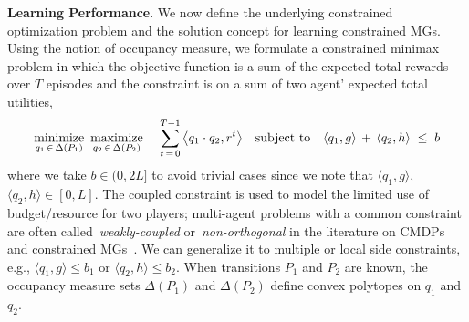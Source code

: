 \documentclass[12pt, final]{l4dc2023}
\begin{document}
\noindent\textbf{Learning Performance}. We now define the underlying constrained optimization problem and the solution concept for learning constrained MGs. Using the notion of occupancy measure, we formulate a constrained minimax problem in which the objective function is a sum of the expected total rewards over $T$ episodes and the constraint is on a sum of two agent' expected total utilities, 
\begin{equation}\label{eq.opt_wc}
\begin{array}{rcl}
\operatorname*{minimize}\limits_{q_1\,\in\,\Delta(P_1)} \,\,\operatorname*{maximize}\limits_{q_2\,\in\,\Delta(P_2)} &&\!\!\!\! \displaystyle \sum_{t\,=\,0}^{T-1} \left\langle q_1\cdot q_2,r^t \right\rangle 
\;\;\; \operatorname*{subject~to} \;\;\;
\left\langle q_1,g \right\rangle \,+\,\left\langle q_2,h \right\rangle\;\leq\; b
\end{array}
\end{equation}
where we take $b \in (0, {2L}]$ to avoid trivial cases since we note that $\langle{q_1},{g}\rangle$, $\langle{q_2},{h}\rangle\in [0,L]$. The coupled constraint is used to model the limited use of budget/resource for two players; multi-agent problems with a common constraint are often called~\emph{weakly-coupled} or~\emph{non-orthogonal} in the literature on CMDPs~\citep{meuleau1998solving,boutilier2016budget,wei2018online,salemi2018approximate,gagrani2020weakly} and constrained MGs~\citep{altman2008constrained,altman2009constrained,kulkarni2011generalized,singh2014characterization,kulkarni2017games}. We can generalize it to multiple or local side constraints, e.g., $\langle{q_1},{g}\rangle \leq b_1$ or $\langle{q_2},{h}\rangle\leq b_2$. When transitions $P_1$ and $P_2$ are known, the occupancy measure sets $\Delta(P_1)$ and $\Delta(P_2)$ define convex polytopes on $q_1$ and $q_2$. 
\end{document}
